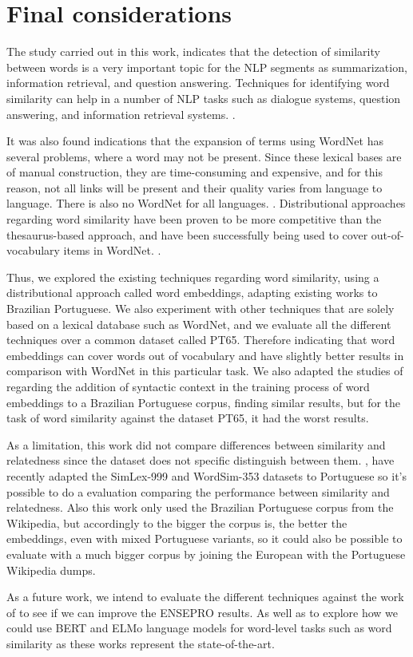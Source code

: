 \section{Final considerations}\label{chap:conclusions}

The study carried out in this work, indicates that the detection of similarity between words is a very important topic for the NLP segments as summarization, information retrieval, and question answering. Techniques for identifying word similarity can help in a number of NLP tasks such as dialogue systems, question answering, and information retrieval systems. \cite{Islam2007ApplicationsOC,Pilehvar2013,Agirre2009}.

It was also found indications that the expansion of terms using WordNet has several problems, where a word may not be present. Since these lexical bases are of manual construction, they are time-consuming and expensive, and for this reason, not all links will be present and their quality varies from language to language.  There is also no WordNet for all languages. \cite{Leeuwenberga2016}. Distributional approaches regarding word similarity have been proven to be more competitive than the thesaurus-based approach, and have been successfully being used to cover out-of-vocabulary items in WordNet.  \cite{gonccalo2018distributional, Agirre2009}.

Thus, we explored the existing techniques regarding word similarity, using a distributional approach called word embeddings, adapting existing works to Brazilian Portuguese. We also experiment with other techniques that are solely based on a lexical database such as WordNet, and we evaluate all the different techniques over a common dataset called PT65. Therefore indicating that word embeddings can cover words out of vocabulary and have slightly better results in comparison with WordNet in this particular task. We also adapted the studies of  regarding the addition of syntactic context in the training process of word embeddings to a Brazilian Portuguese corpus, finding similar results, but for the task of word similarity against the dataset PT65, it had the worst results.

As a limitation, this work did not compare differences between similarity and relatedness since the dataset does not specific distinguish between them. , have recently adapted the SimLex-999 and WordSim-353 datasets to Portuguese so it's possible to do a evaluation comparing the performance between similarity and relatedness. Also this work only used the Brazilian Portuguese corpus from the Wikipedia, but accordingly to  the bigger the corpus is, the better the embeddings, even with mixed Portuguese variants, so it could also be possible to evaluate with a much bigger corpus by joining the European with the Portuguese Wikipedia dumps.

As a future work, we intend to evaluate the different techniques against the work of  to see if we can improve the ENSEPRO results. As well as to explore how we could use BERT and ELMo language models for word-level tasks such as word similarity as these works represent the state-of-the-art.